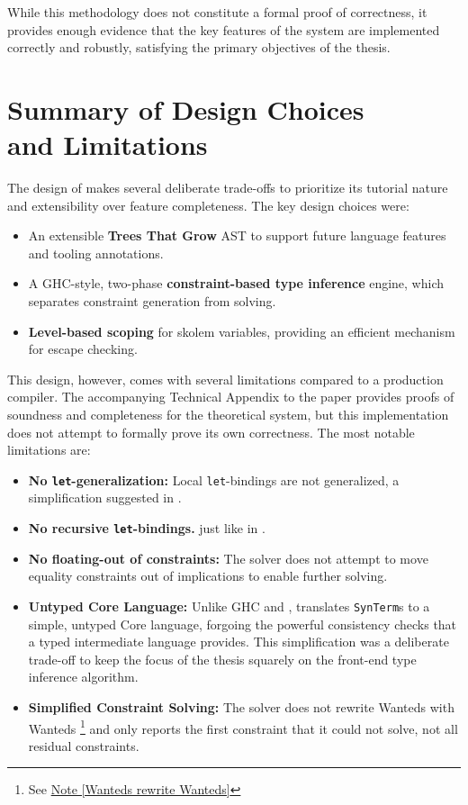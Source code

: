 While this methodology does not constitute a formal proof of correctness, it provides enough evidence that the key features of the system are implemented correctly and robustly, satisfying the primary objectives of the thesis.

\section[Summary of Design Choices and Limitations]{Summary of Design Choices \\ and Limitations}
\label{sec:Design:Summary}

The design of \Arralac makes several deliberate trade-offs to prioritize its tutorial nature and extensibility over feature completeness. The key design choices were:
\begin{itemize}
    \item An extensible \textbf{Trees That Grow} AST to support future language features and tooling annotations.
    \item A GHC-style, two-phase \textbf{constraint-based type inference} engine, which separates constraint generation from solving.
    \item \textbf{Level-based scoping} for skolem variables, providing an efficient mechanism for escape checking.
\end{itemize}

This design, however, comes with several limitations compared to a production compiler. The accompanying Technical Appendix to the paper \cite{practical-type-inference-proofs} provides proofs of soundness and completeness for the theoretical system, but this implementation does not attempt to formally prove its own correctness. The most notable limitations are:
\begin{itemize}
    \item \textbf{No \texttt{let}-generalization:} Local \texttt{let}-bindings are not generalized, a simplification suggested in \cite{vytiniotis-outsideinx-2011}.
    \item \textbf{No recursive \texttt{let}-bindings.} just like in \cite{jones-practical-2007}.
    \item \textbf{No floating-out of constraints:} The solver does not attempt to move equality constraints out of implications to enable further solving.
    \item \textbf{Untyped Core Language:} Unlike GHC and \cite{jones-practical-2007}, \Arralac translates \texttt{SynTerm}s to a simple, untyped Core language, forgoing the powerful consistency checks that a typed intermediate language provides. This simplification was a deliberate trade-off to keep the focus of the thesis squarely on the front-end type inference algorithm.
    \item \textbf{Simplified Constraint Solving:} The solver does not rewrite Wanteds with Wanteds \footnote{See \href{https://github.com/ghc/ghc/blob/ed38c09bd89307a7d3f219e1965a0d9743d0ca73/compiler/GHC/Tc/Types/Constraint.hs\#L2415}{Note [Wanteds rewrite Wanteds]}} and only reports the first constraint that it could not solve, not all residual constraints.
\end{itemize}